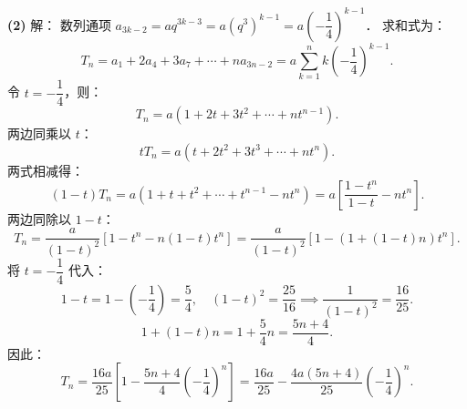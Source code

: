 \begin{answer}
\textbf{(2)} 解：
数列通项 $a_{3k-2} = a q^{3k-3} = a (q^3)^{k-1} = a \left(-\dfrac{1}{4}\right)^{k-1}$．
求和式为：
\nopagebreak[4]
\[
T_n = a_1 + 2a_4 + 3a_7 + \cdots + na_{3n-2} = a \sum_{k=1}^n k \left(-\frac{1}{4}\right)^{k-1}.
\]
令 $t = -\dfrac{1}{4}$，则：
\nopagebreak[4]
\[
T_n = a(1 + 2t + 3t^2 + \cdots + nt^{n-1}).
\]
两边同乘以 $t$：
\nopagebreak[4]
\[
t T_n = a(t + 2t^2 + 3t^3 + \cdots + nt^n).
\]
两式相减得：
\nopagebreak[4]
\[
(1 - t) T_n = a(1 + t + t^2 + \cdots + t^{n-1} - nt^n) = a\left[\frac{1 - t^n}{1 - t} - nt^n\right].
\]
两边同除以 $1 - t$：
\nopagebreak[4]
\[
T_n = \frac{a}{(1 - t)^2}\left[1 - t^n - n(1 - t)t^n\right] = \frac{a}{(1 - t)^2}\left[1 - (1 + (1 - t)n)t^n\right].
\]
将 $t = -\dfrac{1}{4}$ 代入：
\nopagebreak[4]
\[
1 - t = 1 - \left(-\frac{1}{4}\right) = \frac{5}{4}, \quad (1 - t)^2 = \frac{25}{16} \implies \frac{1}{(1 - t)^2} = \frac{16}{25}.
\]
\nopagebreak[4]
\[
1 + (1 - t)n = 1 + \frac{5}{4}n = \frac{5n + 4}{4}.
\]
因此：
\nopagebreak[4]
\[
T_n = \frac{16a}{25}\left[1 - \frac{5n + 4}{4}\left(-\frac{1}{4}\right)^n\right] = \frac{16a}{25} - \frac{4a(5n + 4)}{25}\left(-\frac{1}{4}\right)^n.
\]



\end{answer}
